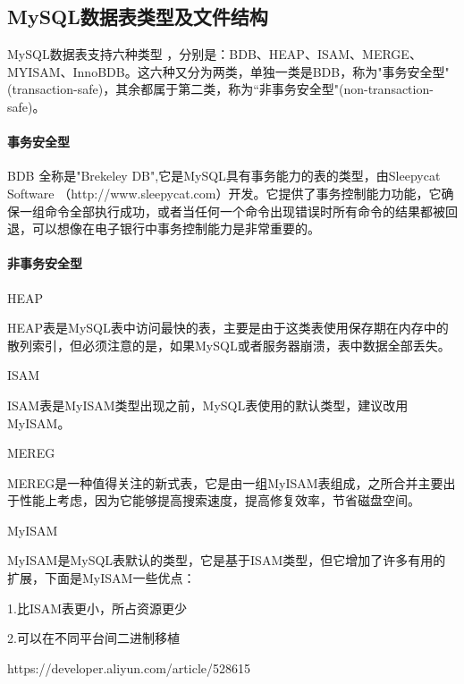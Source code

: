 \documentclass[../../../interview-questions.tex]{subfiles}
\begin{document}
\subsection{MySQL数据表类型及文件结构}

MySQL数据表支持六种类型 ，分别是：BDB、HEAP、ISAM、MERGE、MYISAM、InnoBDB。这六种又分为两类，单独一类是BDB，称为"事务安全型"(transaction-safe)，其余都属于第二类，称为“非事务安全型"(non-transaction-safe)。

\paragraph{事务安全型}

BDB 全称是"Brekeley DB",它是MySQL具有事务能力的表的类型，由Sleepycat Software （http://www.sleepycat.com）开发。它提供了事务控制能力功能，它确保一组命令全部执行成功，或者当任何一个命令出现错误时所有命令的结果都被回退，可以想像在电子银行中事务控制能力是非常重要的。

\paragraph{非事务安全型}

HEAP

HEAP表是MySQL表中访问最快的表，主要是由于这类表使用保存期在内存中的散列索引，但必须注意的是，如果MySQL或者服务器崩溃，表中数据全部丢失。

ISAM

ISAM表是MyISAM类型出现之前，MySQL表使用的默认类型，建议改用MyISAM。

MEREG

MEREG是一种值得关注的新式表，它是由一组MyISAM表组成，之所合并主要出于性能上考虑，因为它能够提高搜索速度，提高修复效率，节省磁盘空间。

MyISAM

MyISAM是MySQL表默认的类型，它是基于ISAM类型，但它增加了许多有用的扩展，下面是MyISAM一些优点：

1.比ISAM表更小，所占资源更少

2.可以在不同平台间二进制移植


https://developer.aliyun.com/article/528615
\end{document}
